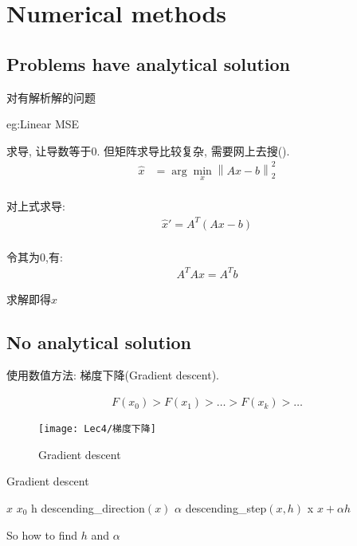 \section{Numerical methods}

\subsection{Problems have analytical solution}
    对有解析解的问题

    eg:Linear MSE

    求导, 让导数等于0. 但矩阵求导比较复杂, 需要网上去搜().
    \begin{align*}
        \hat{x}&=\arg \min_x \left\| Ax-b \right\|_2^2\\
    \end{align*}

    对上式求导:
    \begin{align*}
        \hat{x}'=A^T(Ax-b)\\
    \end{align*}

    令其为0,有:
    \begin{align*}
        A^TAx=A^Tb
    \end{align*}

    求解即得$\hat{x}$

\subsection{No analytical solution}
    使用数值方法: 梯度下降(Gradient descent).

    \begin{align*}
        F(x_0)>F(x_1)>\dots >F(x_k)>\dots
    \end{align*}
    \begin{figure}[H]
        \centering
        \texttt{[image: Lec4/梯度下降]}
        \caption{Gradient descent}
    \end{figure}
    \begin{algorithm}[H]
        \caption{Gradient descent}
        \begin{algorithmic}[1]
            \State $x$ \gets $x_0$ 
                \State h \gets descending\_direction$(x)$ 
                \State $\alpha$ \gets descending\_step$(x,h)$ 
                \State x \gets $x+\alpha h$ 
            \EndWhile
        \end{algorithmic}
    \end{algorithm}
    So how to find $h$ and $\alpha$
